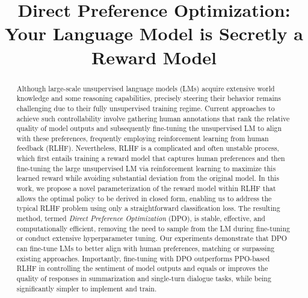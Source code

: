 \title{Direct Preference Optimization: Your Language Model is Secretly a Reward Model}

\begin{abstract}
Although large-scale unsupervised language models (LMs) acquire extensive world knowledge and some reasoning capabilities, precisely steering their behavior remains challenging due to their fully unsupervised training regime. Current approaches to achieve such controllability involve gathering human annotations that rank the relative quality of model outputs and subsequently fine-tuning the unsupervised LM to align with these preferences, frequently employing reinforcement learning from human feedback (RLHF). Nevertheless, RLHF is a complicated and often unstable process, which first entails training a reward model that captures human preferences and then fine-tuning the large unsupervised LM via reinforcement learning to maximize this learned reward while avoiding substantial deviation from the original model. In this work, we propose a novel parameterization of the reward model within RLHF that allows the optimal policy to be derived in closed form, enabling us to address the typical RLHF problem using only a straightforward classification loss. The resulting method, termed \textit{Direct Preference Optimization} (DPO), is stable, effective, and computationally efficient, removing the need to sample from the LM during fine-tuning or conduct extensive hyperparameter tuning. Our experiments demonstrate that DPO can fine-tune LMs to better align with human preferences, matching or surpassing existing approaches. Importantly, fine-tuning with DPO outperforms PPO-based RLHF in controlling the sentiment of model outputs and equals or improves the quality of responses in summarization and single-turn dialogue tasks, while being significantly simpler to implement and train.
\end{abstract}

